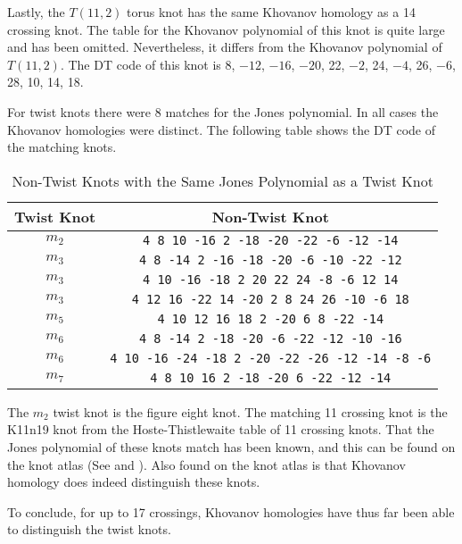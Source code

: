\documentclass{article}
\theoremstyle{plain}
\begin{document}
        Lastly, the $T(11,2)$ torus knot has the same Khovanov homology as a
        14 crossing knot. The table for the Khovanov polynomial of this knot
        is quite large and has been omitted. Nevertheless, it differs from the
        Khovanov polynomial of $T(11,2)$. The DT code of this knot is
        8, $-12$, $-16$, $-20$, 22, $-2$, 24, $-4$, 26, $-6$, 28, 10, 14, 18.
        \par\hfill\par
        For twist knots there were 8 matches for the Jones polynomial. In all
        cases the Khovanov homologies were distinct. The following table shows
        the DT code of the matching knots.
        \begin{table}[H]
            \centering
            \begin{tabular}{| c | c |}
                \hline
                Twist Knot&Non-Twist Knot\\
                \hline
                $m_{2}$&\texttt{4 8 10 -16 2 -18 -20 -22 -6 -12 -14}\\
                \hline
                $m_{3}$&\texttt{4 8 -14 2 -16 -18 -20 -6 -10 -22 -12}\\
                \hline
                $m_{3}$&\texttt{4 10 -16 -18 2 20 22 24 -8 -6 12 14}\\
                \hline
                $m_{3}$&\texttt{4 12 16 -22 14 -20 2 8 24 26 -10 -6 18}\\
                \hline
                $m_{5}$&\texttt{4 10 12 16 18 2 -20 6 8 -22 -14}\\
                \hline
                $m_{6}$&\texttt{4 8 -14 2 -18 -20 -6 -22 -12 -10 -16}\\
                \hline
                $m_{6}$&\texttt{4 10 -16 -24 -18 2 -20 -22 -26 -12 -14 -8 -6}\\
                \hline
                $m_{7}$&\texttt{4 8 10 16 2 -18 -20 6 -22 -12 -14}\\
                \hline
            \end{tabular}
            \caption{Non-Twist Knots with the Same Jones Polynomial as a Twist Knot}
        \end{table}
        The $m_{2}$ twist knot is the figure eight knot. The matching 11
        crossing knot is the K11n19 knot from the
        Hoste-Thistlewaite table of 11 crossing knots. That the Jones polynomial
        of these knots match has been known, and this can be found on the
        knot atlas (See \cite{KatlasFigureEight} and \cite{KatlasK11n19}). Also
        found on the knot atlas is that Khovanov homology does indeed
        distinguish these knots.
        \par\hfill\par
        To conclude, for up to 17 crossings, Khovanov homologies
        have thus far been able to distinguish the twist knots.
\end{document}
